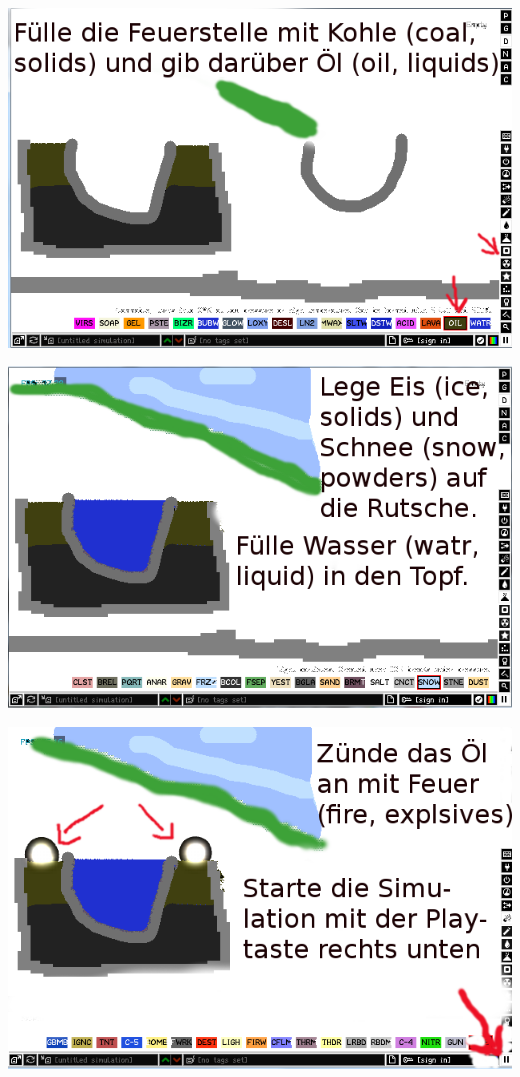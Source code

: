 \begin{center}
\includegraphics[width=\linewidth]{powdertoytutorial/powdertoytutorial3.png}
\end{center}

\begin{center}
\includegraphics[width=\linewidth]{powdertoytutorial/powdertoytutorial4.png}
\end{center}

\begin{center}
\includegraphics[width=\linewidth]{powdertoytutorial/powdertoytutorial5.png}
\end{center}

